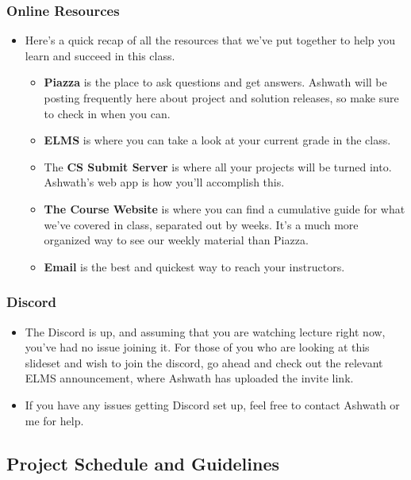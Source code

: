 \documentclass{beamer}
\begin{document}
            \begin{frame}
            	\frametitle{Online Resources}
            	\begin{itemize}
            		\item Here's a quick recap of all the resources that we've put together to help you learn and succeed in this class.
            		\begin{itemize}
            			\item \textbf{Piazza} is the place to ask questions and get answers. Ashwath will be posting frequently here about project and solution releases, so make sure to check in when you can.
            			\item \textbf{ELMS} is where you can take a look at your current grade in the class.
            			\item The \textbf{CS Submit Server} is where all your projects will be turned into. Ashwath's web app is how you'll accomplish this.
            			\item \textbf{The Course Website} is where you can find a cumulative guide for what we've covered in class, separated out by weeks. It's a much more organized way to see our weekly material than Piazza.
            			\item \textbf{Email} is the best and quickest way to reach your instructors.
            		\end{itemize}
            	\end{itemize}
            \end{frame}
            
            \begin{frame}
            	\frametitle{Discord}
            	\begin{itemize}
            		\item The Discord is up, and assuming that you are watching lecture right now, you've had no issue joining it. For those of you who are looking at this slideset and wish to join the discord, go ahead and check out the relevant ELMS announcement, where Ashwath has uploaded the invite link.
            		\item If you have any issues getting Discord set up, feel free to contact Ashwath or me for help.
            	\end{itemize}
            \end{frame}
			\subsection{Project Schedule and Guidelines}    
       
\end{document}
